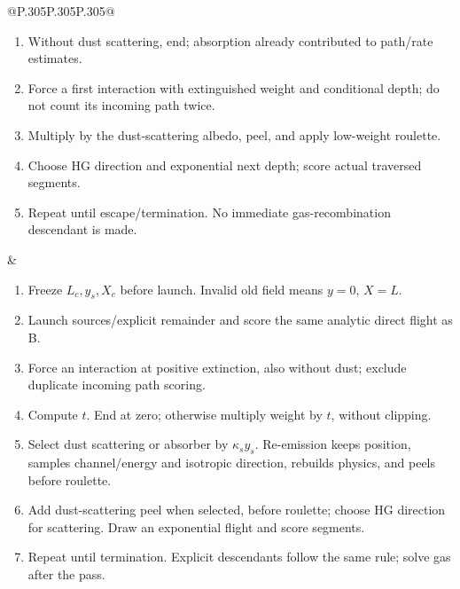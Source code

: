 \documentclass[english,a4paper]{my_memo}
\begin{document}
\begin{table}[p]
\begin{tabular}{@{}P{.305\linewidth}P{.305\linewidth}P{.305\linewidth}@{}}
\begin{minipage}[t]{\linewidth}
\begin{enumerate}[leftmargin=1.35em,itemsep=6pt]
\item Without dust scattering, end; absorption already contributed to path/rate estimates.
\item Force a first interaction with extinguished weight and conditional depth; do not count its incoming path twice.
\item Multiply by the dust-scattering albedo, peel, and apply low-weight roulette.
\item Choose HG direction and exponential next depth; score actual traversed segments.
\item Repeat until escape/termination. No immediate gas-recombination descendant is made.
\end{enumerate}\end{minipage}
&\begin{minipage}[t]{\linewidth}\vspace{0pt}
\begin{enumerate}[leftmargin=1.35em,itemsep=6pt]
\item Freeze $L_c,y_s,X_c$ before launch. Invalid old field means $y=0$, $X=L$.
\item Launch sources/explicit remainder and score the same analytic direct flight as B.
\item Force an interaction at positive extinction, also without dust; exclude duplicate incoming path scoring.
\item Compute $t$. End at zero; otherwise multiply weight by $t$, without clipping.
\item Select dust scattering or absorber by $\kappa_sy_s$. Re-emission keeps position, samples channel/energy and isotropic direction, rebuilds physics, and peels before roulette.
\item Add dust-scattering peel when selected, before roulette; choose HG direction for scattering. Draw an exponential flight and score segments.
\item Repeat until termination. Explicit descendants follow the same rule; solve gas after the pass.
\end{enumerate}\end{minipage}\\\bottomrule
\end{tabular}
\caption{Side-by-side pseudocode. A keeps normalization within an
ordinary history; B/C analytically integrate the first flight and use
weighted continuation. This is source-read control flow, not timing evidence.}
\label{tab:histories}
\end{table}
\end{document}
